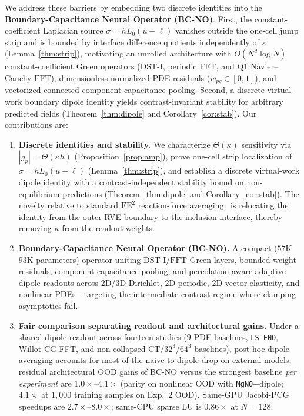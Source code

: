 \documentclass[preprint,11pt]{elsarticle}
\newcommand{\abs}[1]{\left\lvert #1 \right\rvert}
\begin{document}
We address these barriers by embedding two discrete identities into the \textbf{Boundary-Capacitance Neural Operator (BC-NO)}. First, the constant-coefficient Laplacian source $\sigma = h L_0(u-\ell)$ vanishes outside the one-cell jump strip and is bounded by interface difference quotients independently of $\kappa$ (Lemma~\ref{thm:strip}), motivating an unrolled architecture with $O(N^d\log N)$ constant-coefficient Green operators ($\mathrm{DST}$-I, periodic $\mathrm{FFT}$, and Q1 Navier--Cauchy $\mathrm{FFT}$), dimensionless normalized PDE residuals ($w_{pq} \in [0,1]$), and vectorized connected-component capacitance pooling. Second, a discrete virtual-work boundary dipole identity yields contrast-invariant stability for arbitrary predicted fields (Theorem~\ref{thm:dipole} and Corollary~\ref{cor:stab}). Our contributions are:
\begin{enumerate}
  \item \textbf{Discrete identities and stability.} We characterize $\Theta(\kappa)$ sensitivity via $\abs{g_p} = \Theta(\kappa h)$ (Proposition~\ref{prop:amp}), prove one-cell strip localization of $\sigma = h L_0(u-\ell)$ (Lemma~\ref{thm:strip}), and establish a discrete virtual-work dipole identity with a contrast-independent stability bound on non-equilibrium predictions (Theorem~\ref{thm:dipole} and Corollary~\ref{cor:stab}). The novelty relative to standard $\mathrm{FE}^2$ reaction-force averaging~\cite{miehe2002strain,kouznetsova2001approach,geers2010multiscale} is relocating the identity from the outer RVE boundary to the inclusion interface, thereby removing $\kappa$ from the readout weights.
  \item \textbf{Boundary-Capacitance Neural Operator (BC-NO).} A compact ($57\mathrm{K}$--$93\mathrm{K}$ parameters) operator uniting $\mathrm{DST}$-I/$\mathrm{FFT}$ Green layers, bounded-weight residuals, component capacitance pooling, and percolation-aware adaptive dipole readouts across 2D/3D Dirichlet, 2D periodic, 2D vector elasticity, and nonlinear PDEs---targeting the intermediate-contrast regime where clamping asymptotics fail.
  \item \textbf{Fair comparison separating readout and architectural gains.} Under a shared dipole readout across fourteen studies (9 PDE baselines, \texttt{LS-FNO}, Willot CG-FFT, and non-collapsed CT/$32^3$/$64^3$ baselines), post-hoc dipole averaging accounts for most of the naive-to-dipole drop on external models; residual architectural OOD gains of BC-NO versus the strongest baseline \emph{per experiment} are $1.0\times$--$4.1\times$ (parity on nonlinear OOD with \texttt{MgNO}+dipole; $4.1\times$ at $1{,}000$ training samples on Exp.~2 OOD). Same-GPU Jacobi-PCG speedups are $2.7\times$--$8.0\times$; same-CPU sparse LU is $0.86\times$ at $N=128$.

\end{enumerate}
\end{document}
